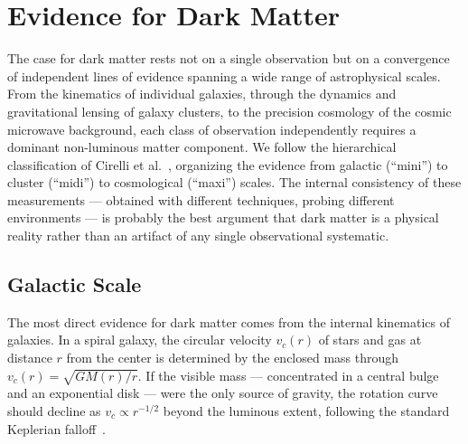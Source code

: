 
\section{Evidence for Dark Matter}
\label{sec:1.1}

The case for dark matter rests not on a single observation but on a convergence of independent lines of evidence spanning a wide range of astrophysical scales.
From the kinematics of individual galaxies, through the dynamics and gravitational lensing of galaxy clusters, to the precision cosmology of the cosmic microwave background, each class of observation independently requires a dominant non-luminous matter component.
We follow the hierarchical classification of Cirelli et al.~\cite{Cirelli:2024ssz}, organizing the evidence from galactic (``mini'') to cluster (``midi'') to cosmological (``maxi'') scales.
The internal consistency of these measurements --- obtained with different techniques, probing different environments --- is probably the best argument that dark matter is a physical reality rather than an artifact of any single observational systematic.

\subsection{Galactic Scale}
\label{sec:1.1.1}

The most direct evidence for dark matter comes from the internal kinematics of galaxies.
In a spiral galaxy, the circular velocity $v_c(r)$ of stars and gas at distance $r$ from the center is determined by the enclosed mass through $v_c(r) = \sqrt{GM(r)/r}$.
If the visible mass --- concentrated in a central bulge and an exponential disk --- were the only source of gravity, the rotation curve should decline as $v_c \propto r^{-1/2}$ beyond the luminous extent, following the standard Keplerian falloff~\cite{Cirelli:2024ssz}.

